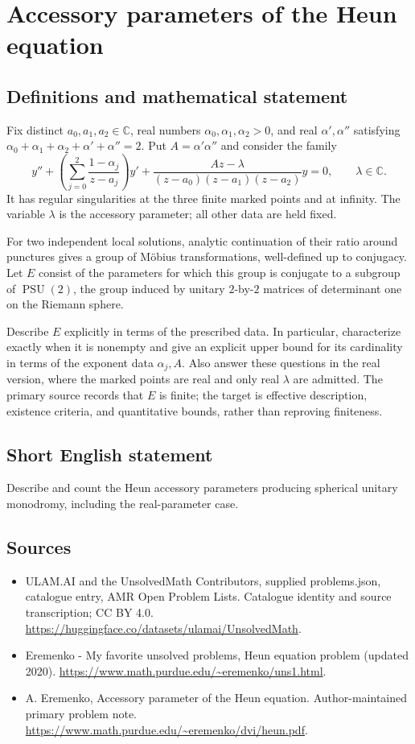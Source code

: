 \documentclass[11pt,a4paper]{article}
\begin{document}
\section*{Accessory parameters of the Heun equation}\label{statement}

\subsection{Definitions and mathematical statement}
Fix distinct $a_0,a_1,a_2\in\mathbb C$, real numbers
$\alpha_0,\alpha_1,\alpha_2>0$, and real $\alpha',\alpha''$
satisfying $\alpha_0+\alpha_1+\alpha_2+\alpha'+\alpha''=2$.
Put $A=\alpha'\alpha''$ and consider the family
\[
 y''+\left(\sum_{j=0}^2\frac{1-\alpha_j}{z-a_j}\right)y'
       +\frac{Az-\lambda}{(z-a_0)(z-a_1)(z-a_2)}y=0,
       \qquad\lambda\in\mathbb C.
\]
It has regular singularities at the three finite marked points
and at infinity. The variable $\lambda$ is the accessory
parameter; all other data are held fixed.

For two independent local solutions, analytic continuation of
their ratio around punctures gives a group of Möbius
transformations, well-defined up to conjugacy. Let $E$ consist
of the parameters for which this group is conjugate to a
subgroup of $\operatorname{PSU}(2)$, the group induced by
unitary $2$-by-$2$ matrices of determinant one on the
Riemann sphere.

Describe $E$ explicitly in terms of the prescribed data.
In particular, characterize exactly when it is nonempty and
give an explicit upper bound for its cardinality in terms of
the exponent data $\alpha_j,A$. Also answer these questions
in the real version, where the marked points are real and
only real $\lambda$ are admitted. The primary source records
that $E$ is finite; the target is effective description,
existence criteria, and quantitative bounds, rather than
reproving finiteness.
\subsection{Short English statement}
Describe and count the Heun accessory parameters producing spherical unitary monodromy, including the real-parameter case.
\subsection{Sources}
\begin{itemize}
\item[S1] ULAM.AI and the UnsolvedMath Contributors, supplied problems.json, catalogue entry, AMR Open Problem Lists. Catalogue identity and source transcription; CC BY 4.0.
\url{https://huggingface.co/datasets/ulamai/UnsolvedMath}.
\item[S2] Eremenko - My favorite unsolved problems, Heun equation problem (updated 2020). 
\url{https://www.math.purdue.edu/~eremenko/uns1.html}.
\item[S3] A. Eremenko, Accessory parameter of the Heun equation. Author-maintained primary problem note.
\url{https://www.math.purdue.edu/~eremenko/dvi/heun.pdf}.
\end{itemize}
\end{document}
